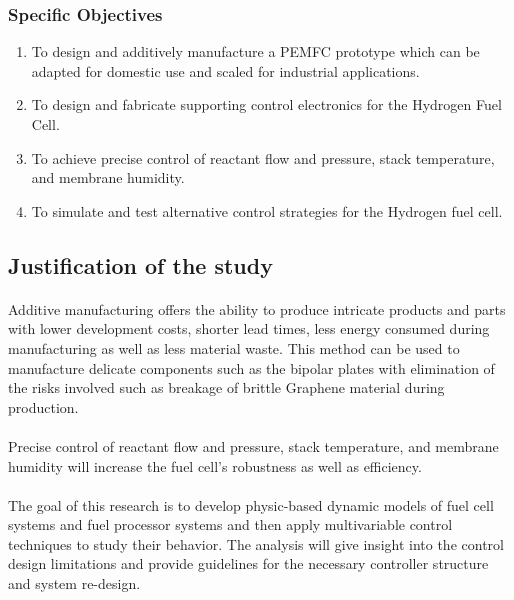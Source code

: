 \subsubsection{Specific Objectives}
\begin{enumerate}
\item To design and additively manufacture a PEMFC prototype which can be adapted for domestic use and scaled for industrial applications.
\item To design and fabricate supporting control electronics for the Hydrogen Fuel Cell.
\item To achieve precise control of reactant flow and pressure, stack temperature, and membrane humidity.
\item To simulate and test alternative control strategies for the Hydrogen fuel cell. 
\end{enumerate}
\subsection{Justification of the study}
\paragraph{}Additive manufacturing offers the ability to produce intricate products and parts with lower development costs, shorter lead times, less energy consumed during manufacturing as well as less material waste. This method can be used to manufacture delicate components such as the bipolar plates with elimination of the risks involved such as breakage of brittle Graphene material during production.     
\paragraph{}Precise control of reactant flow and pressure, stack temperature, and membrane humidity will increase the fuel cell’s robustness as well as efficiency.
\paragraph{}The goal of this research is to develop physic-based dynamic models of fuel cell systems and fuel processor systems and then apply multivariable control techniques to study their behavior. The analysis will give insight into the control design limitations and provide guidelines for the necessary controller structure and system re-design.